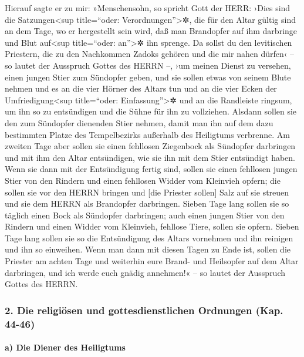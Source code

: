 Hierauf sagte er zu mir: »Menschensohn, so spricht Gott
der HERR: ›Dies sind die Satzungen\textless sup title=``oder:
Verordnungen''\textgreater✲, die für den Altar gültig sind an dem Tage,
wo er hergestellt sein wird, daß man Brandopfer auf ihm darbringe und
Blut auf\textless sup title=``oder: an''\textgreater✲ ihn sprenge.
Da sollst du den levitischen Priestern, die zu den
Nachkommen Zadoks gehören und die mir nahen dürfen‹ -- so lautet der
Ausspruch Gottes des HERRN --, ›um meinen Dienst zu versehen, einen
jungen Stier zum Sündopfer geben, und sie sollen etwas
von seinem Blute nehmen und es an die vier Hörner des Altars tun und an
die vier Ecken der Umfriedigung\textless sup title=``oder:
Einfassung''\textgreater✲ und an die Randleiste ringsum, um ihn so zu
entsündigen und die Sühne für ihn zu vollziehen. Alsdann
sollen sie den zum Sündopfer dienenden Stier nehmen, damit man ihn auf
dem dazu bestimmten Platze des Tempelbezirks außerhalb des Heiligtums
verbrenne. Am zweiten Tage aber sollen sie einen
fehllosen Ziegenbock als Sündopfer darbringen und mit ihm den Altar
entsündigen, wie sie ihn mit dem Stier entsündigt haben.
Wenn sie dann mit der Entsündigung fertig sind, sollen
sie einen fehllosen jungen Stier von den Rindern und einen fehllosen
Widder vom Kleinvieh opfern; die sollen sie vor den HERRN
bringen und {[}die Priester sollen{]} Salz auf sie streuen und sie dem
HERRN als Brandopfer darbringen. Sieben Tage lang sollen
sie so täglich einen Bock als Sündopfer darbringen; auch einen jungen
Stier von den Rindern und einen Widder vom Kleinvieh, fehllose Tiere,
sollen sie opfern. Sieben Tage lang sollen sie so die
Entsündigung des Altars vornehmen und ihn reinigen und ihn so einweihen.
Wenn man dann mit diesen Tagen zu Ende ist, sollen die
Priester am achten Tage und weiterhin eure Brand- und Heilsopfer auf dem
Altar darbringen, und ich werde euch gnädig annehmen!« -- so lautet der
Ausspruch Gottes des HERRN.

\hypertarget{die-religiuxf6sen-und-gottesdienstlichen-ordnungen-kap.-44-46}{%
\subsubsection{2. Die religiösen und gottesdienstlichen Ordnungen (Kap.
44-46)}\label{die-religiuxf6sen-und-gottesdienstlichen-ordnungen-kap.-44-46}}

\hypertarget{a-die-diener-des-heiligtums}{%
\paragraph{a) Die Diener des
Heiligtums}\label{a-die-diener-des-heiligtums}}

